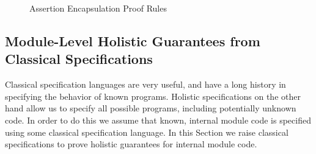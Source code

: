 \begin{figure}[t]
\caption{Assertion Encapsulation Proof Rules}
\label{f:asrt-encap}
\end{figure}


\subsection{Module-Level Holistic Guarantees from Classical Specifications}
\label{s:classical-proof}
Classical specification languages are very useful, 
and have a long history in specifying the behavior 
of known programs. Holistic specifications on the 
other hand allow us to specify all possible programs, 
including potentially unknown code. In order to do this
we assume that known, internal module code is specified
using some classical specification language. In this Section
we raise classical specifications to prove holistic guarantees
for internal module code.

